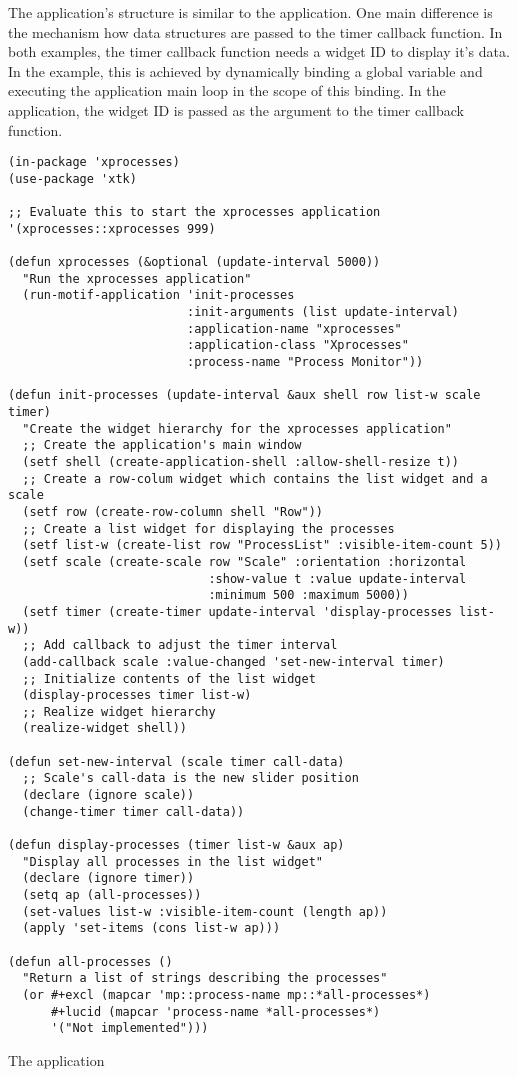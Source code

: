 The application's structure is similar to the  application.  One
main difference is the mechanism how data structures are passed to the timer
callback function.  In both examples, the timer callback function needs a widget
ID to display it's data.  In the  example, this is achieved by
dynamically binding a global variable and executing the application main loop in
the scope of this binding.  In the  application, the widget ID
is passed as the  argument to the timer callback function. 

\begin{proglist}[htbp]
\fnsize\begin{verbatim}
(in-package 'xprocesses)
(use-package 'xtk)

;; Evaluate this to start the xprocesses application
'(xprocesses::xprocesses 999)

(defun xprocesses (&optional (update-interval 5000))
  "Run the xprocesses application"
  (run-motif-application 'init-processes
                         :init-arguments (list update-interval)
                         :application-name "xprocesses"
                         :application-class "Xprocesses"
                         :process-name "Process Monitor"))

(defun init-processes (update-interval &aux shell row list-w scale timer)
  "Create the widget hierarchy for the xprocesses application"
  ;; Create the application's main window
  (setf shell (create-application-shell :allow-shell-resize t))
  ;; Create a row-colum widget which contains the list widget and a scale
  (setf row (create-row-column shell "Row"))
  ;; Create a list widget for displaying the processes
  (setf list-w (create-list row "ProcessList" :visible-item-count 5))
  (setf scale (create-scale row "Scale" :orientation :horizontal
                            :show-value t :value update-interval
                            :minimum 500 :maximum 5000))
  (setf timer (create-timer update-interval 'display-processes list-w))
  ;; Add callback to adjust the timer interval
  (add-callback scale :value-changed 'set-new-interval timer)
  ;; Initialize contents of the list widget
  (display-processes timer list-w)
  ;; Realize widget hierarchy
  (realize-widget shell))

(defun set-new-interval (scale timer call-data)
  ;; Scale's call-data is the new slider position
  (declare (ignore scale))
  (change-timer timer call-data))

(defun display-processes (timer list-w &aux ap)
  "Display all processes in the list widget"
  (declare (ignore timer))
  (setq ap (all-processes))
  (set-values list-w :visible-item-count (length ap))
  (apply 'set-items (cons list-w ap)))

(defun all-processes ()
  "Return a list of strings describing the processes"
  (or #+excl (mapcar 'mp::process-name mp::*all-processes*)
      #+lucid (mapcar 'process-name *all-processes*)
      '("Not implemented")))
\end{verbatim}\normalsize
\caption{\label{prog:xprocesses}The application }
\end{proglist}

